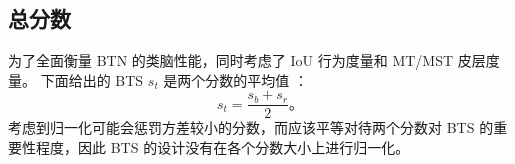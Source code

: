 \subsection{总分数}
为了全面衡量 BTN 的类脑性能，同时考虑了 IoU 行为度量和 MT/MST 皮层度量。
下面给出的 BTS $s_{t}$ 是两个分数的平均值 ：
\begin{equation} \label{equ:score_btn}
s_{t} = \frac{s_b + s_r}{2}\mbox{。}
\end{equation}
考虑到归一化可能会惩罚方差较小的分数，而应该平等对待两个分数对 BTS 的重要性程度，因此 BTS 的设计没有在各个分数大小上进行归一化。


%




